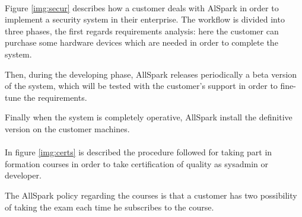 \paragraph{}
Figure \ref{img:secur} describes how a customer deals with
AlSpark in order to implement a security system in their 
enterprise.
The workflow is divided into three phases, the first regards
requirements analysis: here the customer can purchase some 
hardware devices which are needed in order to complete the
system.

Then, during the developing phase, AllSpark releases periodically
a beta version of the system, which will be tested with the customer's
support in order to fine-tune the requirements.

Finally when the system is completely operative, AllSpark install
the definitive version on the customer machines. 

\paragraph{}
In figure \ref{img:certs} is described the procedure followed for
taking part in formation courses in order to take certification of
quality as sysadmin or developer.

The AllSpark policy regarding the courses is that a customer has 
two possibility of taking the exam each time he subscribes to the
course. 

